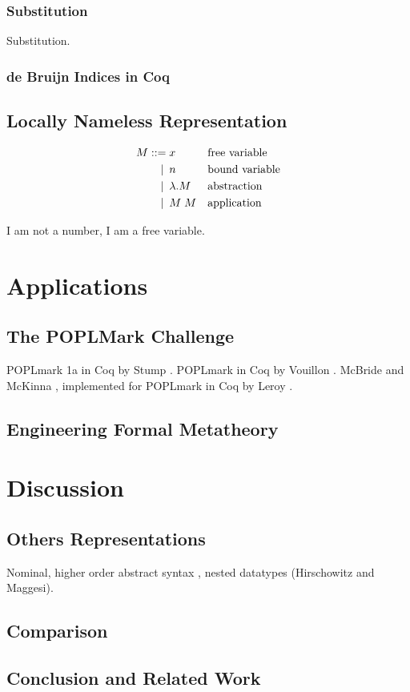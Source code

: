 \documentclass[a4paper,11pt]{article}
\begin{document}

\subsubsection*{Substitution}

Substitution.

\subsubsection*{de Bruijn Indices in Coq}


\subsection{Locally Nameless Representation}

\begin{align*}
  M ::=             &\; x
  && \text{free variable} \\
  \llap{\textbar\:} &\; n
  && \text{bound variable} \\
  \llap{\textbar\:} &\; \lambda .M
    && \text{abstraction} \\
  \llap{\textbar\:} &\; M \; M
  && \text{application} \\
\end{align*}

I am not a number, I am a free variable.


\section{Applications}

\subsection{The POPLMark Challenge}

POPLmark 1a in Coq by Stump \cite{Stump-05}.
POPLmark in Coq by Vouillon \cite{Vouillon-05}.
McBride and McKinna \cite{McBride-McKinna-04}, implemented for POPLmark in Coq by Leroy \cite{Leroy-07}.

\subsection{Engineering Formal Metatheory}


\section{Discussion}\label{sec:discussion}

\subsection{Others Representations}

Nominal, higher order abstract syntax \cite{Capretta-Felty-06}, nested datatypes (Hirschowitz and Maggesi).

\subsection{Comparison}

\subsection{Conclusion and Related Work}


\nocite{*}


\end{document}
